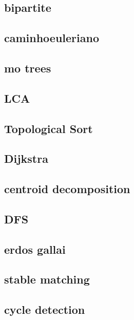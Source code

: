 \subsection{bipartite}
\raggedbottom
\hrulefill
\subsection{caminhoeuleriano}
\raggedbottom
\hrulefill
\subsection{mo trees}
\raggedbottom
\hrulefill
\subsection{LCA}
\raggedbottom
\hrulefill
\subsection{Topological Sort}
\raggedbottom
\hrulefill
\subsection{Dijkstra}
\raggedbottom
\hrulefill
\subsection{centroid decomposition}
\raggedbottom
\hrulefill
\subsection{DFS}
\raggedbottom
\hrulefill
\subsection{erdos gallai}
\raggedbottom
\hrulefill
\subsection{stable matching}
\raggedbottom
\hrulefill
\subsection{cycle detection}
\raggedbottom
\hrulefill
